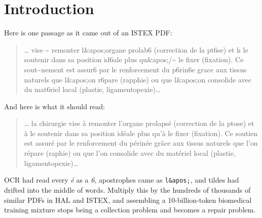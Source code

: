 %

\section{Introduction}

\begin{reviewread}
Here is one passage as it came out of an ISTEX PDF:
\end{reviewread}

\begin{quote}\small\ttfamily\raggedright
\dots{} vise \textasciitilde{} remonter l\&apos;organe prolab6 (correction de la pt6se) et h le soutenir dans sa position id6ale plus qu\&apos;/\textasciitilde{} le fixer (fixation). Ce sout\textasciitilde{}nement est assur6 par le renforcement du p6rin6e grace aux tissus naturels que l\&apos;on r6pare (rapphie) ou que l\&apos;on consolide avec du mat6riel local (plastie, ligamentopexie)\dots{}
\end{quote}

\begin{reviewread}
\noindent And here is what it should read:
\end{reviewread}

\begin{quote}\small
\dots{} la chirurgie vise à remonter l'organe prolapsé (correction de la ptose) et à le soutenir dans sa position idéale plus qu'à le fixer (fixation). Ce soutien est assuré par le renforcement du périnée grâce aux tissus naturels que l'on répare (raphie) ou que l'on consolide avec du matériel local (plastie, ligamentopexie)\dots{}
\end{quote}

\begin{reviewread}
\noindent OCR had read every \emph{é} as a \emph{6}, apostrophes came as \texttt{l\&apos;}, and tildes had drifted into the middle of words. Multiply this by the hundreds of thousands of similar PDFs in HAL and ISTEX, and assembling a 10-billion-token biomedical training mixture stops being a collection problem and becomes a repair problem.
\end{reviewread}

